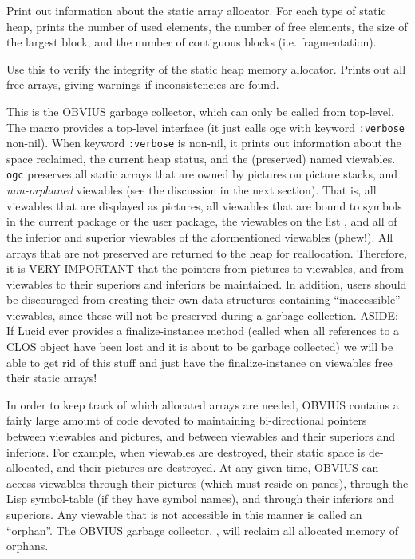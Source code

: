 \begin{description}
\item{}
Print out information about the static array allocator.  For each type
of static heap, prints the number of used elements, the number of free
elements, the size of the largest block, and the number of contiguous
blocks (i.e. fragmentation).

\item{}
Use this to verify the integrity of the static heap memory allocator.
Prints out all free arrays, giving warnings if inconsistencies are
found.

\item{}
This is the OBVIUS garbage collector, which can only be called from
top-level.  The  macro provides a top-level interface
(it just calls ogc with keyword {\tt :verbose} non-nil).  When keyword
{\tt :verbose} is non-nil, it prints out information about the space
reclaimed, the current heap status, and the (preserved) named
viewables.  {\tt ogc} preserves all static arrays that are owned by
pictures on picture stacks, and {\em non-orphaned} viewables (see the
discussion in the next section).  That is, all viewables that are
displayed as pictures, all viewables that are bound to symbols in the
current package or the user package, the viewables on the list
, and all of the inferior and superior
viewables of the aformentioned viewables (phew!).  All arrays that are
not preserved are returned to the heap for reallocation.  Therefore,
it is VERY IMPORTANT that the pointers from pictures to viewables, and
from viewables to their superiors and inferiors be maintained.  In
addition, users should be discouraged from creating their own data
structures containing ``inaccessible'' viewables, since these will not
be preserved during a garbage collection.  ASIDE: If Lucid ever
provides a finalize-instance method (called when all references to a
CLOS object have been lost and it is about to be garbage collected) we
will be able to get rid of this stuff and just have the
finalize-instance on viewables free their static arrays!

\end{description}

In order to keep track of which allocated arrays are needed, OBVIUS
contains a fairly large amount of code devoted to maintaining
bi-directional pointers between viewables and pictures, and between
viewables and their superiors and inferiors.  For example, when
viewables are destroyed, their static space is de-allocated, and their
pictures are destroyed.  At any given time, OBVIUS can access
viewables through their pictures (which must reside on panes), through
the Lisp symbol-table (if they have symbol names), and through their
inferiors and superiors.  Any viewable that is not accessible in this
manner is called an ``orphan''.  The OBVIUS garbage collector,
, will reclaim all allocated memory of orphans.

